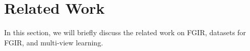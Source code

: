 

\section{Related Work}\label{chap3:sec:related_work}

In this section, we will briefly discuss the related work on FGIR, datasets for FGIR, and multi-view learning. 

\vspace{-3mm}
